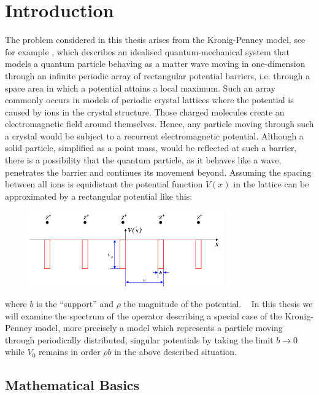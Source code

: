 \chapter{Introduction} \label{chap1}

The problem considered in this thesis arises from the Kronig-Penney model, see for example \cite[Chap. 3]{HeeringEP}, which describes an idealised quantum-mechanical system that models a quantum particle behaving as a matter wave moving in one-dimension through an infinite periodic array of rectangular potential barriers, i.e. through a space area in which a potential attains a local maximum. Such an array commonly occurs in models of periodic crystal lattices where the potential is caused by ions in the crystal structure. Those charged molecules create an electromagnetic field around themselves. Hence, any particle moving through such a crystal would be subject to a recurrent electromagnetic potential. Although a solid particle, simplified as a point mass, would be reflected at such a barrier, there is a possibility that the quantum particle, as it behaves like a wave, penetrates the barrier and continues its movement beyond. Assuming the spacing between all ions is equidistant the potential function $V(x)$ in the lattice can be approximated by a rectangular potential like this:

\begin{figure}[h!] \centering
	  \includegraphics[width=0.75\textwidth]{Periodic_square_potential_130707} 
\end{figure}

where $b$ is the \enquote{support} and $\rho$ the magnitude of the potential.
~\newpage %
In this thesis we will examine the spectrum of the operator describing a special case of the Kronig-Penney model, more precisely a model which represents a particle moving through periodically distributed, singular potentials by taking the limit $b \rightarrow 0$ while $V_{0}$ remains in order $\rho b$ in the above described situation.

\section*{Mathematical Basics}

